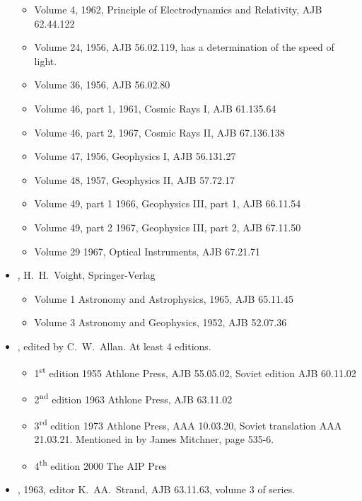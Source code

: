 \begin{itemize}
\begin{itemize}
  \item Volume 4, 1962, Principle of Electrodynamics and Relativity,
    AJB 62.44.122
  \item Volume 24, 1956, AJB 56.02.119, has a determination of the
    speed of light.
  \item Volume 36, 1956, AJB 56.02.80
  \item Volume 46, part 1, 1961, Cosmic Rays I, AJB 61.135.64
  \item Volume 46, part 2, 1967, Cosmic Rays II, AJB 67.136.138
    \item Volume 47, 1956, Geophysics I, AJB 56.131.27
  \item Volume 48, 1957, Geophysics II, AJB 57.72.17
  \item Volume 49, part 1 1966, Geophysics III, part 1, AJB 66.11.54
  \item Volume 49, part 2 1967, Geophysics III, part 2, AJB 67.11.50
  \item Volume 29 1967, Optical Instruments, AJB 67.21.71
    
  \end{itemize}

\item {}, H.\ H.\ Voight,
  Springer-Verlag
  \begin{itemize}
  \item Volume 1 Astronomy and Astrophysics, 1965, AJB 65.11.45
  \item Volume 3 Astronomy and Geophysics, 1952, AJB 52.07.36
  \end{itemize}
  
  
\item {}, edited by C.\ W.\ Allan. At least
  4 editions.
  \begin{itemize}
  \item 1\textsuperscript{st} edition 1955 Athlone Press, AJB
    55.05.02, Soviet edition AJB 60.11.02
  \item 2\textsuperscript{nd} edition 1963 Athlone Press, AJB 63.11.02
  \item 3\textsuperscript{rd} edition 1973 Athlone Press, AAA
    10.03.20, Soviet translation AAA 21.03.21.  Mentioned in
     by James Mitchner, page 535-6.
  \item 4\textsuperscript{th} edition 2000 The AIP Pres
  \end{itemize}

\item {}, 1963, editor K.\ AA.\ Strand, AJB
  63.11.63, volume 3 of  series.


\end{itemize}
